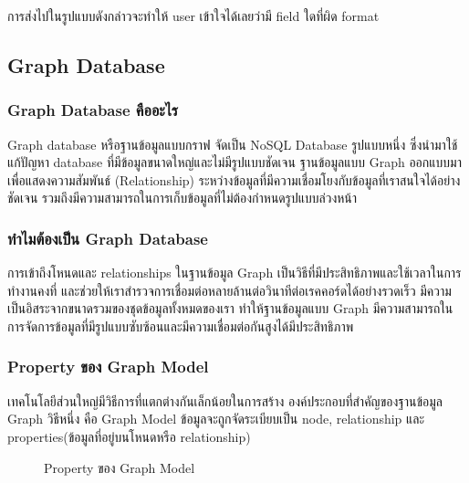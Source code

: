 \documentclass[14pt,oneside,openright,a4paper]{cpe-thai-project}
\begin{document}
การส่งไปในรูปแบบดังกล่าวจะทำให้ user เข้าใจได้เลยว่ามี field ใดที่ผิด format



\subsection {Graph Database} 
  \subsubsection {Graph Database คืออะไร}
    Graph database \cite{GraphDatabase} หรือฐานข้อมูลแบบกราฟ จัดเป็น NoSQL Database รูปแบบหนึ่ง ซึ่งนำมาใช้แก้ปัญหา database ที่มีข้อมูลขนาดใหญ่และไม่มีรูปแบบชัดเจน
    ฐานข้อมูลแบบ Graph ออกแบบมาเพื่อแสดงความสัมพันธ์ (Relationship) ระหว่างข้อมูลที่มีความเชื่อมโยงกับข้อมูลที่เราสนใจได้อย่างชัดเจน รวมถึงมีความสามารถในการเก็บข้อมูลที่ไม่ต้องกำหนดรูปแบบล่วงหน้า
  \subsubsection {ทำไมต้องเป็น Graph Database}
    การเข้าถึงโหนดและ relationships ในฐานข้อมูล Graph เป็นวิธีที่มีประสิทธิภาพและใช้เวลาในการทำงานคงที่ และช่วยให้เราสำรวจการเชื่อมต่อหลายล้านต่อวินาทีต่อเรคคอร์ดได้อย่างรวดเร็ว
    มีความเป็นอิสระจากขนาดรวมของชุดข้อมูลทั้งหมดของเรา ทำให้ฐานข้อมูลแบบ Graph มีความสามารถในการจัดการข้อมูลที่มีรูปแบบซับซ้อนและมีความเชื่อมต่อกันสูงได้มีประสิทธิภาพ 

  \subsubsection {Property ของ Graph Model \cite{GraphDatabaseProperty}} 
    เทคโนโลยีส่วนใหญ่มีวิธีการที่แตกต่างกันเล็กน้อยในการสร้าง องค์ประกอบที่สำคัญของฐานข้อมูล Graph วิธีหนึ่ง คือ Graph Model ข้อมูลจะถูกจัดระเบียบเป็น node, relationship และ properties(ข้อมูลที่อยู่บนโหนดหรือ relationship)

    \begin{figure}[!h]\centering
      \setlength{\fboxrule}{0.5mm} %
      \setlength{\fboxsep}{0.5cm}
      \caption{Property ของ Graph Model}\label{fig:Graph}
      \end{figure}
\end{document}
